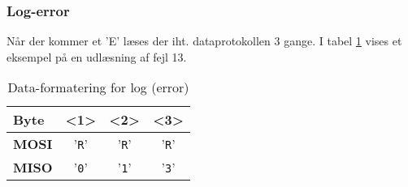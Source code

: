 \subsubsection*{Log-error}

Når der kommer et 'E' læses der iht. dataprotokollen 3 gange. I tabel \ref{table:SWProtokol-logerror} vises et eksempel på en udlæsning af fejl 13.

\begin{table}[H]
	\caption{Data-formatering for log (error)}
	\centering
	\begin{tabular}{|l|c|c|c|}
		\hline 
		\textbf{Byte} & \textbf{<1>} & \textbf{<2>} & \textbf{<3>}  \\ 
		\hline 
		\textbf{MOSI}  & '\verb+R+' & '\verb+R+' & '\verb+R+'  \\ 
		\hline 
		\textbf{MISO}  & '\verb+0+' & '\verb+1+' & '\verb+3+'  \\ 
		\hline 
	\end{tabular} 
	\label{table:SWProtokol-logerror}
\end{table}
